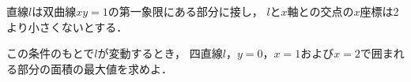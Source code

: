\documentclass[../../main.tex]{subfiles}
\begin{document}
直線$l$は双曲線$xy=1$の第一象限にある部分に接し，
$l$と$x$軸との交点の$x$座標は2より小さくないとする．

この条件のもとで$l$が変動するとき，
四直線$l$，$y=0$，$x=1$および$x=2$で囲まれる部分の面積の最大値を求めよ．
\end{document}
